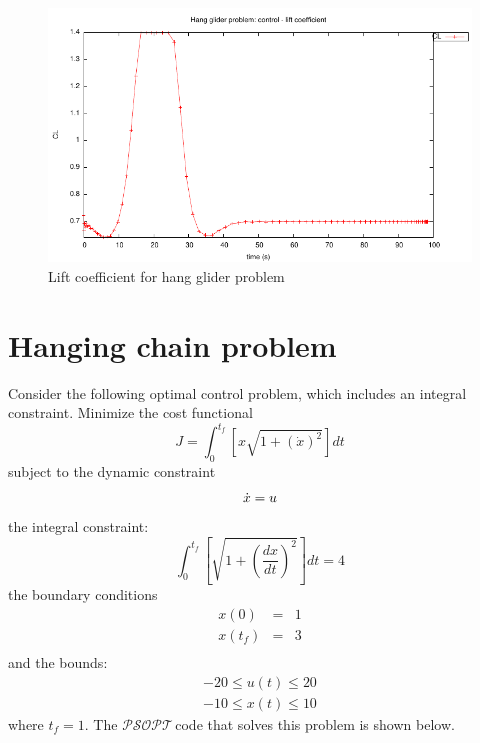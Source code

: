 \documentclass[a4paper,11pt]{report}    %
\newcommand{\psopt}{$\mathcal{PSOPT}$\,}  %
\begin{document}
\begin{figure}
  \centering 
  \includegraphics{../examples/glider/control}
  \caption{Lift coefficient for hang glider problem}
 \label{fig:glider_control}
\end{figure}


\section{Hanging chain problem}

Consider the following optimal control problem, which includes an integral constraint.
Minimize the cost functional
\begin{equation}
  J =  \int_0^{t_f} \left[ x \sqrt{1 + \left(\dot x \right)^2} \right]   dt
\end{equation}
subject to the dynamic constraint
\begin{equation}
    \dot x  =  u \\
\end{equation}
the integral constraint:
\begin{equation}
   \int_0^{t_f}   \left[ \sqrt{1 + \left(\frac{dx}{dt}\right)^2} \right]    dt = 4
\end{equation}
the boundary conditions
\begin{equation}
  \begin{array}{lcl}
    x(0) & = & 1 \\
    x(t_f) & = & 3 \\
  \end{array}
\end{equation}
and the bounds:
\begin{equation}
  \begin{aligned}
     -20 \le u(t) \le 20 \\
     -10 \le x(t) \le 10
  \end{aligned}
\end{equation}
where $t_f=1$. The
\psopt code that solves this problem is shown below.  
\end{document}
